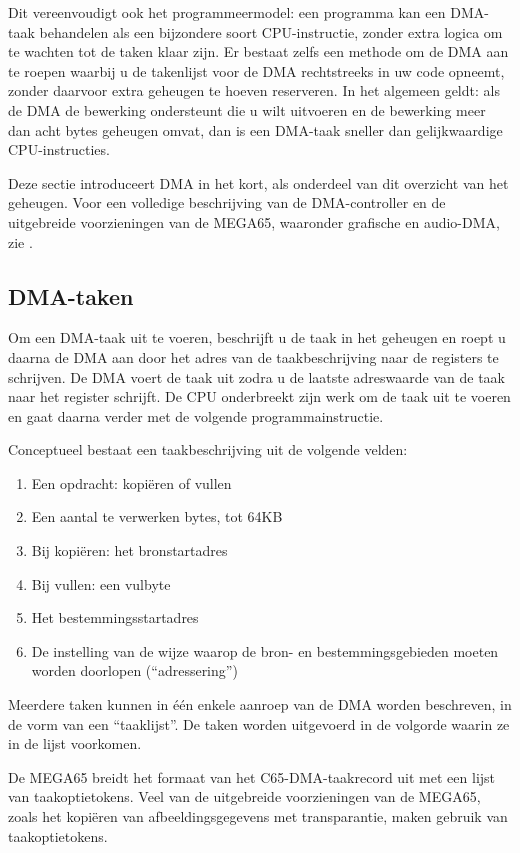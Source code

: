 Dit vereenvoudigt ook het programmeermodel: een programma kan een DMA-taak behandelen als een bijzondere soort CPU-instructie, zonder extra logica om te wachten tot de taken klaar zijn. Er bestaat zelfs een methode om de DMA aan te roepen waarbij u de takenlijst voor de DMA rechtstreeks in uw code opneemt, zonder daarvoor extra geheugen te hoeven reserveren. In het algemeen geldt: als de DMA de bewerking ondersteunt die u wilt uitvoeren en de bewerking meer dan acht bytes geheugen omvat, dan is een DMA-taak sneller dan gelijkwaardige CPU-instructies.

Deze sectie introduceert DMA in het kort, als onderdeel van dit overzicht van het geheugen. Voor een volledige beschrijving van de DMA-controller en de uitgebreide voorzieningen van de MEGA65, waaronder grafische en audio-DMA, zie .

\subsection{DMA-taken}

Om een DMA-taak uit te voeren, beschrijft u de taak in het geheugen en roept u daarna de DMA aan door het adres van de taakbeschrijving naar de registers te schrijven. De DMA voert de taak uit zodra u de laatste adreswaarde van de taak naar het register schrijft. De CPU onderbreekt zijn werk om de taak uit te voeren en gaat daarna verder met de volgende programmainstructie.

Conceptueel bestaat een taakbeschrijving uit de volgende velden:

\begin{enumerate}
\item Een opdracht: kopiëren of vullen\item Een aantal te verwerken bytes, tot 64KB\item Bij kopiëren: het bronstartadres\item Bij vullen: een vulbyte\item Het bestemmingsstartadres\item De instelling van de wijze waarop de bron- en bestemmingsgebieden moeten worden doorlopen (``adressering'')
\end{enumerate}

Meerdere taken kunnen in één enkele aanroep van de DMA worden beschreven, in de vorm van een ``taaklijst''. De taken worden uitgevoerd in de volgorde waarin ze in de lijst voorkomen.

De MEGA65 breidt het formaat van het C65-DMA-taakrecord uit met een lijst van taakoptietokens. Veel van de uitgebreide voorzieningen van de MEGA65, zoals het kopiëren van afbeeldingsgegevens met transparantie, maken gebruik van taakoptietokens.

